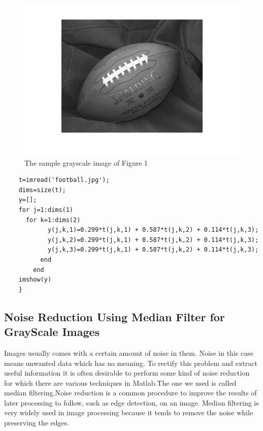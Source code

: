 \documentclass[12pt]{article}
\begin{document}
   \clearpage
   \begin{figure}
   \centering
   \includegraphics[scale=0.5]{footballgray.jpg}
   \caption{The sample grayscale image of Figure 1}
   \end{figure}
   
    \begin{verbatim}
	t=imread('football.jpg');
	dims=size(t);
	y=[];
	for j=1:dims(1)
      for k=1:dims(2)
            y(j,k,1)=0.299*t(j,k,1) + 0.587*t(j,k,2) + 0.114*t(j,k,3);
            y(j,k,2)=0.299*t(j,k,1) + 0.587*t(j,k,2) + 0.114*t(j,k,3);
            y(j,k,3)=0.299*t(j,k,1) + 0.587*t(j,k,2) + 0.114*t(j,k,3);
          end
    	end
	imshow(y)
	}
	\end{verbatim}
    
   \subsection{Noise Reduction Using Median Filter for GrayScale Images}
   Images usually comes with a certain amount of noise in them. Noise in this case means unwanted data which has no meaning. To rectify this problem and extract useful information it is often desirable to perform some kind of noise reduction for which there are various techniques in Matlab.The one we used is called median filtering.Noise reduction is a common procedure to improve the results of later processing to follow, such as edge detection, on an image. Median filtering is very widely used in image processing because it tends to remove the noise while preserving the edges.
    
\end{document}
